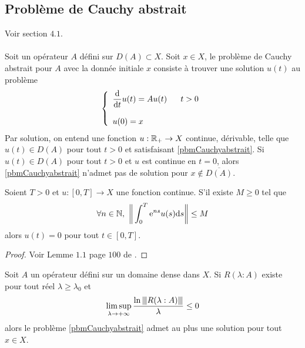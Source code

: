 \subsection{Problème de Cauchy abstrait}
Voir \cite{Pazy1983} section $4.1$.
\\\\
Soit un opérateur $A$ défini sur $D(A) \subset X$. Soit $x \in X$, le problème de Cauchy abstrait pour $A$ avec la donnée initiale $x$ consiste à trouver une solution $u(t)$ au problème 
\begin{equation}\label{pbmCauchyabstrait}
    \left\{\begin{array}{l}
        \dfrac{\mathrm{d}}{\mathrm{d} t}u(t) = Au(t) \ \ \ \ \ t >0 \\
        \\
        u(0)=x
    \end{array}\right.
\end{equation}
Par solution, on entend une fonction $u:\mathbb{R}_+ \rightarrow X$ continue, dérivable, telle que $u(t) \in D(A)$ pour tout $t >0$ et satisfaisant \eqref{pbmCauchyabstrait}. Si $u(t) \in D(A)$ pour tout $t>0$ et $u$ est continue en $t=0$, alors \eqref{pbmCauchyabstrait} n'admet pas de solution pour $x \notin \overline{D(A)}$.

\begin{lemme}\label{lemme1}
    Soient $T>0$ et $u:[0,T] \rightarrow X$ une fonction continue. S'il existe $M\geq 0$ tel que
    \begin{equation*}
        \forall n \in \bbN, \ \bigg\|\int_0^T \ex^{ns}u(s)\d s\bigg\| \leq M
    \end{equation*}
    alors $u(t)=0$ pour tout $t \in [0,T]$.
\end{lemme}

\begin{proof}
    Voir Lemme $1.1$ page $100$ de \cite{Pazy1983}.
\end{proof}

\begin{theorem}\label{thm_res_sol}
    Soit $A$ un opérateur défini sur un domaine dense dans $X$. Si $R(\lambda : A)$ existe pour tout réel $\lambda \geq \lambda_0$ et 
    \begin{equation*}
        \limsup_{\lambda \to +\infty} \frac{\ln{\left\vert\kern-0.25ex\left\vert \kern-0.25ex\left\vert R(\lambda:A) \right\vert\kern-0.25ex\right\vert\kern-0.25ex\right\vert}}{\lambda} \leq 0
    \end{equation*}
    alors le problème \eqref{pbmCauchyabstrait} admet au plus une solution pour tout $x \in X$.
\end{theorem}

